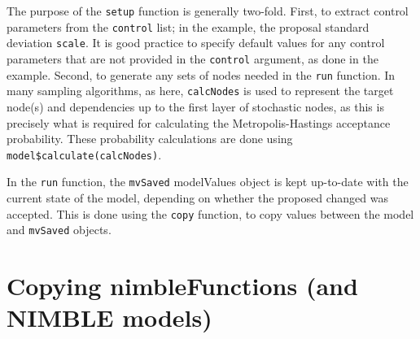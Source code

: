 \documentclass[12pt,oneside]{book}\usepackage[]{graphicx}\usepackage[]{color}
\def\cd#1{\texttt{#1}}
\begin{document}
The purpose of the \cd{setup} function is generally two-fold.  First,
to extract control parameters from the \cd{control} list; in the
example, the proposal standard deviation \cd{scale}.  It is good
practice to specify default values for any control parameters that are
not provided in the \cd{control} argument, as done in the example.  Second, to
generate any sets of nodes needed in the \cd{run} function.  In many
sampling algorithms, as here, \cd{calcNodes} is used to represent the
target node(s) and dependencies up to the first layer of
stochastic nodes, as this is precisely what is required for
calculating the Metropolis-Hastings acceptance probability.  These
probability calculations are done using \cd{model\$calculate(calcNodes)}.

In the \cd{run} function, the \cd{mvSaved} modelValues object is kept up-to-date with
the current state of the model, depending on whether the proposed
changed was accepted.  This is done using the \cd{copy} function, to copy values between the model and \cd{mvSaved} objects.
        
        
        
\section{Copying nimbleFunctions (and NIMBLE models)}
\end{document}
